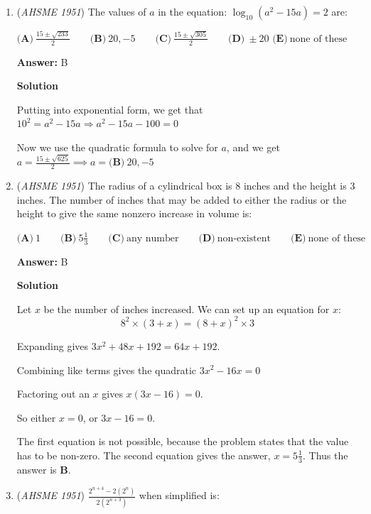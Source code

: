 \begin{enumerate}
 $\textbf{(E)}\ xz^2 > yz^2\implies x>y$, similar reasoning as above but instead, multiply $z^2$.

 


	\item (\textit{AHSME 1951}) The values of $a$ in the equation: $\log_{10}(a^{2}-15a) = 2$ are:


 $\textbf{(A)}\ \frac{15\pm\sqrt{233}}{2}\qquad\textbf{(B)}\ 20,-5\qquad\textbf{(C)}\ \frac{15\pm\sqrt{305}}{2}\qquad\textbf{(D)}\ \pm20$
$\textbf{(E)}\ \text{none of these}$

 \textbf{Answer: }B



\textbf{Solution}

Putting into exponential form, we get that $10^2=a^2-15a\Rightarrow a^2-15a-100=0$

 Now we use the quadratic formula to solve for $a$, and we get $a=\frac{15\pm\sqrt{625}}{2}\implies a=\boxed{\textbf{(B)}\ 20, - 5}$



	\item (\textit{AHSME 1951}) The radius of a cylindrical box is $8$ inches and the height is $3$ inches. The number of inches that may be added to either the radius or the height to give the same nonzero increase in volume is: 


 $\textbf{(A)}\ 1\qquad\textbf{(B)}\ 5\frac{1}{3}\qquad\textbf{(C)}\ \text{any number}\qquad\textbf{(D)}\ \text{non-existent}\qquad\textbf{(E)}\ \text{none of these}$

 \textbf{Answer: }B



\textbf{Solution}

Let $x$ be the number of inches increased. We can set up an equation for $x$: 
 \[8^2 \times (3+x)=(8+x)^2\times 3\]

 Expanding gives $3x^2+48x+192=64x+192$.

 Combining like terms gives the quadratic $3x^2-16x=0$

 Factoring out an $x$ gives $x(3x-16)=0$.

 So either $x=0$, or $3x-16=0$.

 The first equation is not possible, because the problem states that the value has to be non-zero. The second equation gives the answer, $x = \boxed{5\frac{1}{3}}.$ Thus the answer is $\textbf{B}$.

 


	\item (\textit{AHSME 1951}) $\frac{2^{n+4}-2(2^{n})}{2(2^{n+3})}$ when simplified is:



\end{enumerate}
